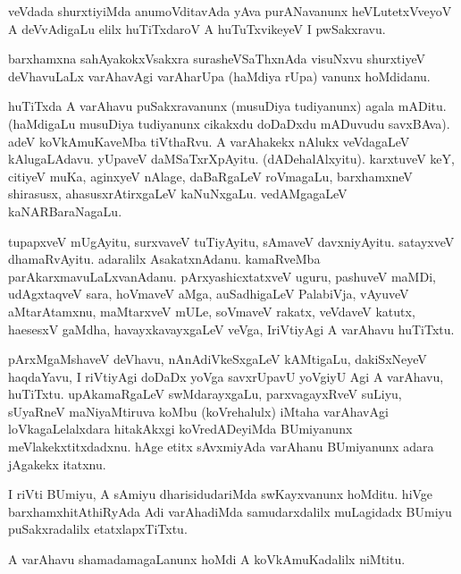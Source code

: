 \documentclass{article}
\begin{document}
\begin{mn}
veVdada  shurxtiyiMda anumoVditavAda  yAva  purANavanunx heVLutetxVveyoV A deVvAdigaLu  
elilx huTiTxdaroV A huTuTxvikeyeV I pwSakxravu.
\end{mn}

\begin{mn}
barxhamxna sahAyakokxVsakxra surasheVSaThxnAda visuNxvu shurxtiyeV deVhavuLaLx varAhavAgi 
varAharUpa (haMdiya rUpa) vanunx  hoMdidanu.
\end{mn}

\begin{mn}
huTiTxda A varAhavu puSakxravanunx (musuDiya tudiyanunx) agala mADitu. 
(haMdigaLu musuDiya tudiyanunx cikakxdu doDaDxdu mADuvudu savxBAva).  
adeV koVkAmuKaveMba tiVthaRvu.  A varAhakekx nAlukx veVdagaLeV kAlugaLAdavu.  
yUpaveV daMSaTxrXpAyitu. (dADehalAlxyitu).  karxtuveV keY, citiyeV muKa, 
aginxyeV nAlage, daBaRgaLeV roVmagaLu, barxhamxneV shirasusx,  
ahasusxrAtirxgaLeV kaNuNxgaLu.  vedAMgagaLeV kaNARBaraNagaLu.
\end{mn}

\begin{mn}
tupapxveV mUgAyitu, surxvaveV tuTiyAyitu, sAmaveV davxniyAyitu.  satayxveV 
dhamaRvAyitu.  adaralilx AsakatxnAdanu.  kamaRveMba  parAkarxmavuLaLxvanAdanu.  
pArxyashicxtatxveV   uguru,  pashuveV maMDi, udAgxtaqveV sara,  hoVmaveV aMga, 
auSadhigaLeV  PalabiVja,  vAyuveV aMtarAtamxnu, maMtarxveV mULe, soVmaveV rakatx, 
veVdaveV katutx, haesesxV gaMdha,  havayxkavayxgaLeV veVga, IriVtiyAgi A varAhavu huTiTxtu.
\end{mn}

\begin{mn}
pArxMgaMshaveV deVhavu, nAnAdiVkeSxgaLeV kAMtigaLu, dakiSxNeyeV haqdaYavu,  
I  riVtiyAgi  doDaDx yoVga savxrUpavU  yoVgiyU Agi A varAhavu,  huTiTxtu.  
upAkamaRgaLeV swMdarayxgaLu,  parxvagayxRveV suLiyu, sUyaRneV maNiyaMtiruva
 koMbu (koVrehalulx) iMtaha varAhavAgi loVkagaLelalxdara hitakAkxgi 
 koVredADeyiMda BUmiyanunx  meVlakekxtitxdadxnu.  hAge etitx  sAvxmiyAda 
 varAhanu BUmiyanunx adara jAgakekx itatxnu.
\end{mn}

\begin{mn}
I riVti BUmiyu, A sAmiyu dharisidudariMda swKayxvanunx hoMditu.  hiVge  barxhamxhitAthiRyAda 
Adi varAhadiMda samudarxdalilx muLagidadx BUmiyu puSakxradalilx etatxlapxTiTxtu.
\end{mn}

\begin{mn}
A varAhavu shamadamagaLanunx hoMdi A koVkAmuKadalilx niMtitu. 
\end{mn}
\end{document}
